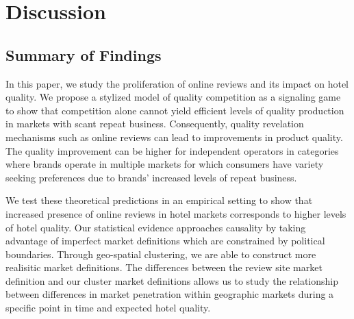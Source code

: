 \documentclass[mksc,blindrev]{informs3} %
\begin{document}







\section{Discussion} \label{sec:discussion}

\subsection{Summary of Findings}

In this paper, we study the proliferation of online reviews and its impact on hotel quality. We propose a stylized model of quality competition as a signaling game to show that competition alone cannot yield efficient levels of quality production in markets with scant repeat business. Consequently, quality revelation mechanisms such as online reviews can lead to improvements in product quality. The quality improvement can be higher for independent operators in categories where brands operate in multiple markets for which consumers have variety seeking preferences due to brands' increased levels of repeat business. 

We test these theoretical predictions in an empirical setting to show that increased presence of online reviews in hotel markets corresponds to higher levels of hotel quality. Our statistical evidence approaches causality by taking advantage of imperfect market definitions which are constrained by political boundaries. Through geo-spatial clustering, we are able to construct more realisitic market definitions. The differences between the review site market definition and our cluster market definitions allows us to study the relationship between differences in market penetration within geographic markets during a specific point in time and expected hotel quality. 
\end{document}
